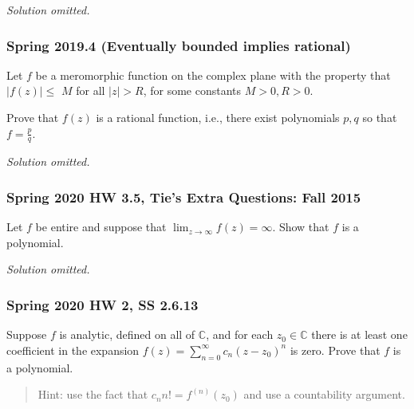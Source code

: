 \emph{Solution omitted.}

\hypertarget{spring-2019.4-eventually-bounded-implies-rational}{%
\subsubsection{Spring 2019.4 (Eventually bounded implies
rational)}\label{spring-2019.4-eventually-bounded-implies-rational}}

\begin{problem}[?]

Let \(f\) be a meromorphic function on the complex plane with the
property that \(|f(z)| \leq\) \(M\) for all \(|z|>R\), for some
constants \(M>0, R>0\).

Prove that \(f(z)\) is a rational function, i.e., there exist
polynomials \(p, q\) so that \(f=\frac{p}{q}\).

\end{problem}

\emph{Solution omitted.}

\hypertarget{spring-2020-hw-3.5-ties-extra-questions-fall-2015}{%
\subsubsection{Spring 2020 HW 3.5, Tie's Extra Questions: Fall
2015}\label{spring-2020-hw-3.5-ties-extra-questions-fall-2015}}

\begin{problem}[?]

Let \(f\) be entire and suppose that
\(\lim_{z \rightarrow \infty} f(z) = \infty\). Show that \(f\) is a
polynomial.

\end{problem}

\emph{Solution omitted.}

\hypertarget{spring-2020-hw-2-ss-2.6.13}{%
\subsubsection{Spring 2020 HW 2, SS
2.6.13}\label{spring-2020-hw-2-ss-2.6.13}}

\begin{problem}[?]

Suppose \(f\) is analytic, defined on all of \({\mathbb{C}}\), and for
each \(z_0 \in {\mathbb{C}}\) there is at least one coefficient in the
expansion \(f(z) = \sum_{n=0}^\infty c_n(z-z_0)^n\) is zero. Prove that
\(f\) is a polynomial.

\begin{quote}
Hint: use the fact that \(c_n n! = f^{(n)}(z_0)\) and use a countability
argument.
\end{quote}

\end{problem}

